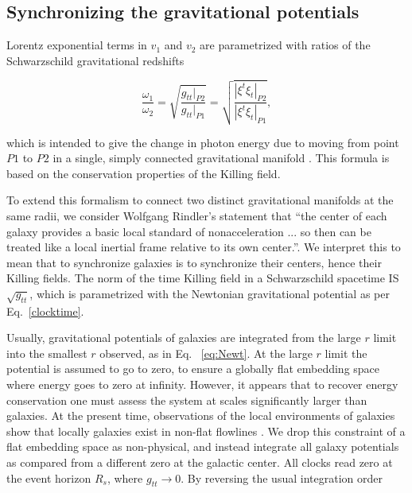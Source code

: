 \documentclass[reprint,%
 amsmath,amssymb,
 aps,
]{revtex4-1}
\begin{document}
 
    
 
\subsection{Synchronizing the gravitational potentials \label{sec:gravDets}}

  
    
    

 
Lorentz exponential terms in  $v_1$ and $v_2$ are parametrized with ratios of  the    Schwarzschild gravitational redshifts

\begin{equation}
       \frac{\omega_1}{\omega_2}  =\sqrt{\frac{g_{tt}|_{P2}}{g_{tt}|_{P1}}} =\sqrt{\frac{|\xi^t\xi_{t}|_{P2}}{|\xi^t\xi_{t}|_{P1}}},
      \label{eq:grav}
    \end{equation} 
    
which is    intended to give the change in  photon energy due to  moving from point $P1$ to $P2$ in a single, simply connected gravitational   manifold \cite{Wald}.   This formula is based on the conservation properties of the Killing field. 


To  extend this formalism   to connect 
  two distinct gravitational manifolds at the same radii, we consider  Wolfgang Rindler's statement that        ``the center of each galaxy provides a basic local standard of nonacceleration ... so then can be treated like a local inertial frame relative to its own center.''\cite{rindler2013essential}.
    We interpret this to mean  that to synchronize galaxies is    to synchronize their centers, hence their Killing fields.  The norm of the time Killing field in a Schwarzschild spacetime IS $\sqrt{g_{tt}}$, which   is  parametrized with the Newtonian gravitational potential as per
    Eq.~\ref{clocktime}. 
    
  
  Usually,   gravitational potentials of galaxies   are integrated  from the large $r$ limit into the smallest $r$ observed, 
  as in Eq.~  \ref{eq:Newt}. At the large $r$ limit      the potential is assumed  to go to zero,   to ensure a  globally  flat embedding space where energy goes to zero at infinity. 
  However,    it appears that to recover energy conservation one must assess the system at scales significantly larger than galaxies.
 At the present time,  observations of  the local environments of galaxies show that locally  galaxies exist in   non-flat flowlines \cite{Pomarede:2020pme,Hoffman:2017ako}. 
 We drop this constraint of a flat embedding space as non-physical, and instead integrate all galaxy  potentials   as compared from a different zero at the galactic center.  All clocks read zero  at the event horizon $R_s$,  where  $g_{tt} \to 0$. By reversing the usual integration order 
 
\end{document}
